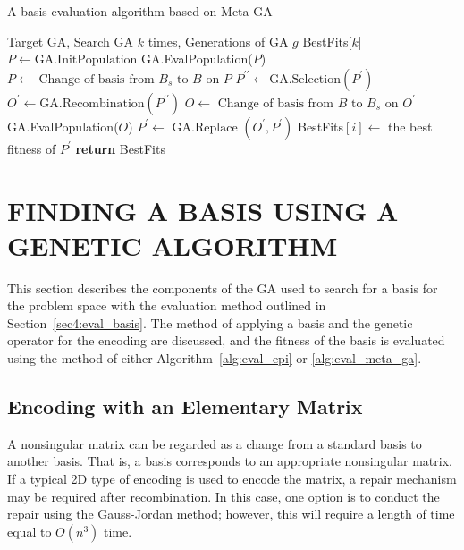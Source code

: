 \begin{algorithm}[H]
	\caption{A basis evaluation algorithm based on Meta-GA}\label{alg:eval_meta_ga}
	\begin{algorithmic}[1]
		\Require Target GA, Search GA $ k $ times, Generations of GA $ g $
		 
		\State BestFits[$k$] 
		\State $ P \gets \text{GA.InitPopulation} $ 
		\State GA.EvalPopulation($P$) 
		\State $ P \gets \text{ Change of basis from } B_s \text{ to } B \text{ on } P $
		\State $ P^{\prime\prime} \gets \text{GA.Selection}(P^\prime) $
		\State $ O^\prime \gets \text{GA.Recombination}(P^{\prime\prime}) $ 
		\State $ O \gets \text{ Change of basis from } B \text{ to } B_s \text{ on } O^\prime $
		\State GA.EvalPopulation($O$)
		\State $ P^\prime \gets \text{ GA.Replace }(O^\prime, P^\prime) $
		\EndFor
		\State BestFits$[i] \gets $ the best fitness of $ P^\prime $
		\EndFor
		\State \textbf{return} BestFits
		\EndProcedure
	\end{algorithmic}
\end{algorithm}

\section{FINDING A BASIS USING A GENETIC ALGORITHM} \label{sec5:find_basis_GA}
This section describes the components of the GA used to search for a basis for the problem space with the evaluation method outlined in Section~\ref{sec4:eval_basis}. The method of applying a basis and the genetic operator for the encoding are discussed, and the fitness of the basis is evaluated using the method of either Algorithm~\ref{alg:eval_epi} or \ref{alg:eval_meta_ga}.

\subsection{Encoding with an Elementary Matrix}
A nonsingular matrix can be regarded as a change from a standard basis to another basis. That is, a basis corresponds to an appropriate nonsingular matrix. If a typical 2D type of encoding is used to encode the matrix, a repair mechanism may be required after recombination. In this case, one option is to conduct the repair using the Gauss-Jordan method; however, this will require a length of time equal to $ O\left(n^3\right) $ time.

